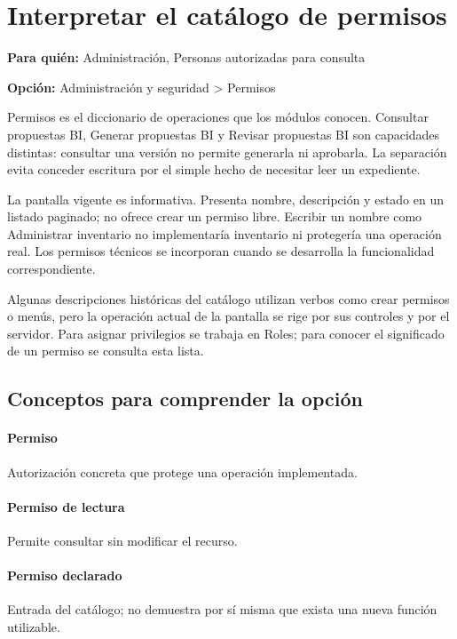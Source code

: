 \section{Interpretar el catálogo de permisos}
\label{unidad:operacion_06}
\textbf{Para quién:} Administración, Personas autorizadas para consulta\par
\textbf{Opción:} Administración y seguridad > Permisos\par

Permisos es el diccionario de operaciones que los módulos conocen. Consultar propuestas BI, Generar propuestas BI y Revisar propuestas BI son capacidades distintas: consultar una versión no permite generarla ni aprobarla. La separación evita conceder escritura por el simple hecho de necesitar leer un expediente.

La pantalla vigente es informativa. Presenta nombre, descripción y estado en un listado paginado; no ofrece crear un permiso libre. Escribir un nombre como Administrar inventario no implementaría inventario ni protegería una operación real. Los permisos técnicos se incorporan cuando se desarrolla la funcionalidad correspondiente.

Algunas descripciones históricas del catálogo utilizan verbos como crear permisos o menús, pero la operación actual de la pantalla se rige por sus controles y por el servidor. Para asignar privilegios se trabaja en Roles; para conocer el significado de un permiso se consulta esta lista.

\subsection{Conceptos para comprender la opción}
\paragraph{Permiso} Autorización concreta que protege una operación implementada.

\paragraph{Permiso de lectura} Permite consultar sin modificar el recurso.

\paragraph{Permiso declarado} Entrada del catálogo; no demuestra por sí misma que exista una nueva función utilizable.


